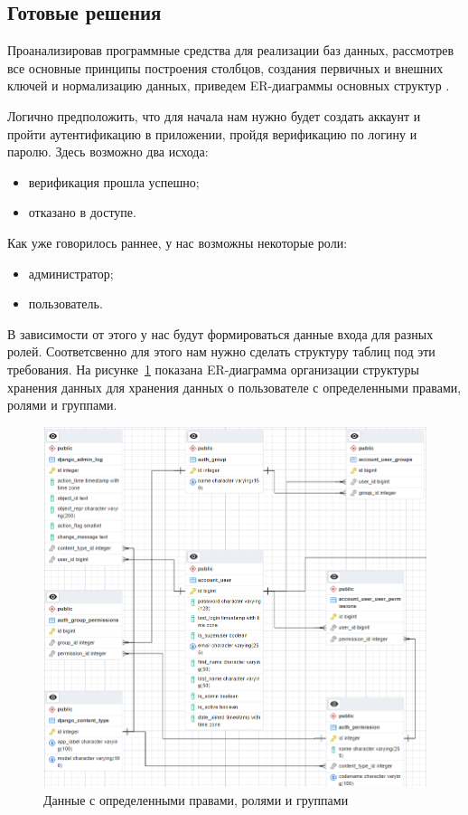 \subsection{Готовые решения}

Проанализировав программные средства для реализации баз данных, рассмотрев все основные принципы построения столбцов, создания первичных и внешних ключей и нормализацию данных, приведем ER-диаграммы основных структур \cite{book4}.

Логично предположить, что для начала нам нужно будет создать аккаунт и пройти аутентификацию в приложении, пройдя верификацию по логину и паролю. Здесь возможно два исхода:

\begin{itemize}
    \item верификация прошла успешно;
    \item отказано в доступе.
\end{itemize}

Как уже говорилось раннее, у нас возможны некоторые роли:

\begin{itemize}
    \item администратор;
    \item пользователь.
\end{itemize}

В зависимости от этого у нас будут формироваться данные входа для разных ролей. Соответсвенно для этого нам нужно сделать структуру таблиц под эти требования. На рисунке~\ref{fig:fig01} показана ER-диаграмма организации структуры хранения данных для хранения данных о пользователе с определенными правами, ролями и группами.

\begin{figure}
  \includegraphics[scale=0.733]{inc/django}
  \caption{Данные с определенными правами, ролями и группами}
  \label{fig:fig01}
\end{figure}

